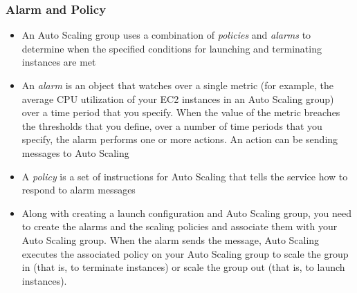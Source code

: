 \documentclass{beamer}
\begin{document}
\begin{frame}
\frametitle{Alarm and Policy}
\begin{itemize}
\item An Auto Scaling group uses a combination of \emph{policies} and \emph{alarms} to determine when the specified conditions for launching and terminating instances are met
\item An \emph{alarm} is an object that watches over a single metric (for example, the average CPU utilization of your EC2 instances in an Auto Scaling group) over a time period that you specify. When the value of the metric breaches the thresholds that you define, over a number of time periods that you specify, the alarm performs one or more actions. An action can be sending messages to Auto Scaling
\item A \emph{policy} is a set of instructions for Auto Scaling that tells the service how to respond to alarm messages
\item Along with creating a launch configuration and Auto Scaling group, you need to create the alarms and the scaling policies and associate them with your Auto Scaling group. When the alarm sends the message, Auto Scaling executes the associated policy on your Auto Scaling group to scale the group in (that is, to terminate instances) or scale the group out (that is, to launch instances).
\end{itemize}

\end{frame}
\end{document}
